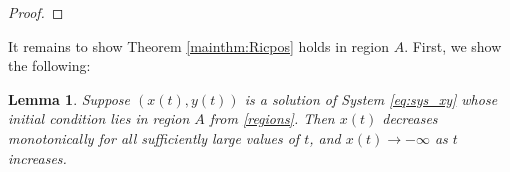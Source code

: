 \documentclass{amsart}
\numberwithin{equation}{section}
\newtheorem{lemma}[equation]{Lemma}
\theoremstyle{plain}
\theoremstyle{definition}
\theoremstyle{remark}
\numberwithin{table}{section}
\begin{document}
\begin{proof}
%
\end{proof}


It remains to show Theorem \ref{mainthm:Ricpos} holds in region $A$.
First, we show the following:

\begin{lemma}\label{lemma E}
    Suppose $(x(t),y(t))$ is a solution of System \eqref{eq:sys_xy} whose initial condition lies in region $A$ from \eqref{regions}.
    Then $x(t)$ decreases monotonically for all sufficiently large values of $t$, and $x(t) \to -\infty$ as $t$ increases.
\end{lemma}
\end{document}
